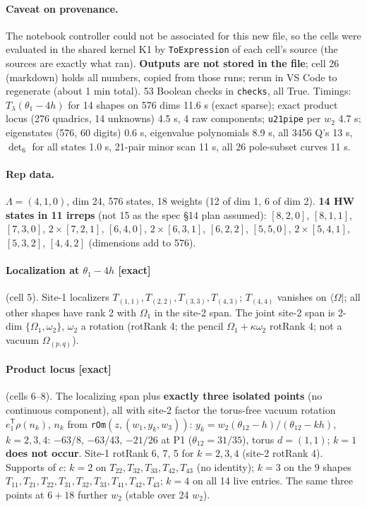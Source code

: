 \documentclass[11pt]{article}
\newcommand{\bra}[1]{\langle #1|}
\newcommand{\Om}{\Omega}
\newcommand{\eT}{e_1^{\mathsf T}}
\newcommand{\Tt}[1]{T_{#1}}
\newcommand{\thh}{\theta_{12}}
\newcommand{\ex}{\textbf{[exact]}}
\newcommand{\nb}[1]{\texttt{#1}}
\begin{document}
\paragraph{Caveat on provenance.} The notebook controller could not be associated for this new file, so the cells were evaluated in the shared kernel K1 by \texttt{ToExpression} of each cell's source (the sources are exactly what ran). \textbf{Outputs are not stored in the file}; cell 26 (markdown) holds all numbers, copied from those runs; rerun in VS Code to regenerate (about 1 min total). 53 Boolean checks in \texttt{checks}, all True. Timings: $T_\lambda(\theta_1-4h)$ for 14 shapes on 576 dims 11.6 s (exact sparse); exact product locus (276 quadrics, 14 unknowns) 4.5 s, 4 raw components; \nb{u21pipe} per $w_2$ 4.7 s; eigenstates (576, 60 digits) 0.6 s, eigenvalue polynomials 8.9 s, all 3456 Q's 13 s, $\det_6$ for all states 1.0 s, 21-pair minor scan 11 s, all 26 pole-subset curves 11 s.

\paragraph{Rep data.} $\Lambda=(4,1,0)$, dim 24, 576 states, 18 weights (12 of dim 1, 6 of dim 2). \textbf{14 HW states in 11 irreps} (not 15 as the spec \S14 plan assumed): $[8,2,0]$, $[8,1,1]$, $[7,3,0]$, $2\times[7,2,1]$, $[6,4,0]$, $2\times[6,3,1]$, $[6,2,2]$, $[5,5,0]$, $2\times[5,4,1]$, $[5,3,2]$, $[4,4,2]$ (dimensions add to 576).

\paragraph{Localization at $\theta_1-4h$ \ex} (cell 5). Site-1 localizers $\Tt{(1,1)},\Tt{(2,2)},\Tt{(3,3)},\Tt{(4,3)}$; $\Tt{(4,4)}$ vanishes on $\bra\Om$; all other shapes have rank 2 with $\Om_1$ in the site-2 span. The joint site-2 span is 2-dim $\{\Om_1,\omega_2\}$, $\omega_2$ a rotation (rotRank 4; the pencil $\Om_1+\kappa\omega_2$ rotRank 4; not a vacuum $\Om_{(p,q)}$).

\paragraph{Product locus \ex} (cells 6--8). The localizing span plus \textbf{exactly three isolated points} (no continuous component), all with site-2 factor the torus-free vacuum rotation $\eT\rho(n_k)$, $n_k$ from \nb{rOm}$(z,(w_1,y_k,w_3))$: $y_k=w_2(\thh-h)/(\thh-kh)$, $k=2,3,4$: $-63/8$, $-63/43$, $-21/26$ at P1 ($\thh=31/35$), torus $d=(1,1)$; \textbf{$k=1$ does not occur}. Site-1 rotRank 6, 7, 5 for $k=2,3,4$ (site-2 rotRank 4). Supports of $c$: $k=2$ on $\Tt{22},\Tt{32},\Tt{33},\Tt{42},\Tt{43}$ (no identity); $k=3$ on the 9 shapes $\Tt{11},\Tt{21},\Tt{22},\Tt{31},\Tt{32},\Tt{33},\Tt{41},\Tt{42},\Tt{43}$; $k=4$ on all 14 live entries. The same three points at $6+18$ further $w_2$ (stable over 24 $w_2$).
\end{document}
